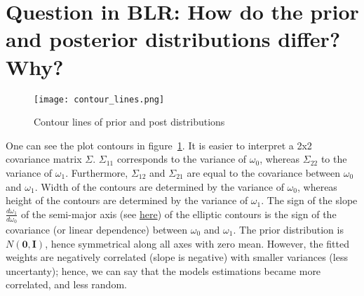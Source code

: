 \documentclass[addpoints]{exam}
\begin{document}
    \section*{Question in BLR: How do the prior and posterior distributions differ? Why?}

    \begin{figure}
        \centering
        \texttt{[image: contour\_lines.png]}
        \caption{Contour lines of prior and post distributions}
        \label{fig:fig1}
    \end{figure}

    One can see the plot contours in figure~\ref{fig:fig1}. 
    It is easier to interpret a 2x2 covariance matrix $\Sigma$. $\Sigma_{11}$ corresponds to the variance of $\omega_0$, whereas $\Sigma_{22}$ to the variance of $\omega_1$. Furthermore, $\Sigma_{12}$ and $\Sigma_{21}$ are equal to the covariance between $\omega_0$ and $\omega_1$. Width of the contours are determined by the variance of $\omega_0$, whereas height of the contours are determined by the variance of $\omega_1$. The sign of the slope $\frac{d\omega_1}{d\omega_0}$ of the semi-major axis (see \href{https://en.wikipedia.org/wiki/Ellipse}{here}) of the elliptic contours is the sign of the covariance (or linear dependence) between $\omega_0$ and $\omega_1$. The prior distribution is $N(\textbf{0},\textbf{I})$, hence symmetrical along all axes with zero mean. However, the fitted weights are negatively correlated (slope is negative) with smaller variances (less uncertanty); hence, we can say that the models estimations became more correlated, and less random.
\end{document}
